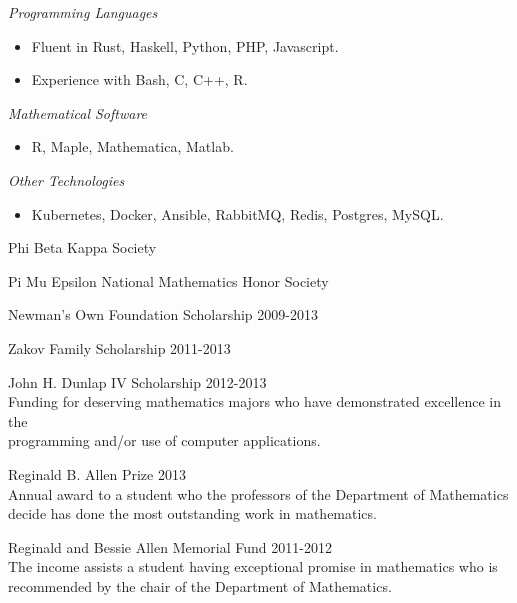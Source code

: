 \documentclass[11pt,article,oneside]{memoir}
\begin{document}


\ind \emph{Programming Languages}
\small
\begin{itemize}
  \item Fluent in Rust, Haskell, Python, PHP, Javascript.
  \item Experience with Bash, C, C++, R.
\end{itemize}
\normalsize

\ind \emph{Mathematical Software}
\small
\begin{itemize}
  \item R, Maple, Mathematica, Matlab.
\end{itemize}
\normalsize

\ind \emph{Other Technologies}
\small
\begin{itemize}
  \item Kubernetes, Docker, Ansible, RabbitMQ, Redis, Postgres, MySQL.
\end{itemize}
\normalsize

\bigskip


\ind Phi Beta Kappa Society

\ind Pi Mu Epsilon National Mathematics Honor Society

\ind Newman's Own Foundation Scholarship \hfill {\small 2009-2013}

\ind Zakov Family Scholarship \hfill {\small 2011-2013}

\ind John H. Dunlap IV Scholarship \hfill {\small 2012-2013} \\
\footnotesize
  Funding for deserving mathematics majors who have demonstrated excellence in
  the \\ programming and/or use of computer applications.
\normalsize

\ind Reginald B. Allen Prize \hfill {\small 2013} \\
\footnotesize
  Annual award to a student who the professors of the Department of
  Mathematics decide has done the most outstanding work in mathematics.
\normalsize

\ind Reginald and Bessie Allen Memorial Fund \hfill {\small 2011-2012} \\
\footnotesize
  The income assists a student having exceptional promise in mathematics who is
  recommended by the chair of the Department of Mathematics.
\normalsize
\end{document}
